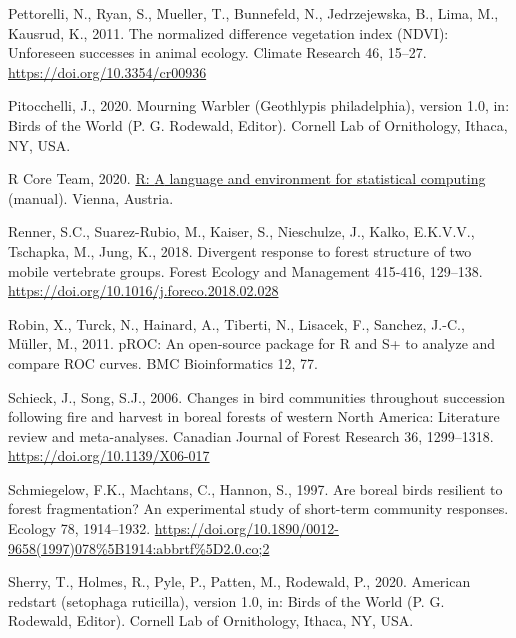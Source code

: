 \documentclass[
]{article}
\newlength{\cslhangindent}
\newlength{\cslentryspacingunit} %
\newenvironment{CSLReferences}[2] %
 {%
  \setlength{\parindent}{0pt}
  \ifodd #1
  \let\oldpar\par
  \def\par{\hangindent=\cslhangindent\oldpar}
  \fi
  \setlength{\parskip}{#2\cslentryspacingunit}
 }%
 {}
\begin{document}
\begin{CSLReferences}{1}{0}
\leavevmode{}%
Pettorelli, N., Ryan, S., Mueller, T., Bunnefeld, N., Jedrzejewska, B., Lima, M., Kausrud, K., 2011. The normalized difference vegetation index ({NDVI}): Unforeseen successes in animal ecology. Climate Research 46, 15--27. \url{https://doi.org/10.3354/cr00936}

\leavevmode{}%
Pitocchelli, J., 2020. Mourning {Warbler} ({Geothlypis} philadelphia), version 1.0, in: Birds of the {World} ({P}. {G}. {Rodewald}, {Editor}). Cornell Lab of Ornithology, Ithaca, NY, USA.

\leavevmode{}%
R Core Team, 2020. \href{https://www.R-project.org/}{R: {A} language and environment for statistical computing} (manual). Vienna, Austria.

\leavevmode{}%
Renner, S.C., Suarez-Rubio, M., Kaiser, S., Nieschulze, J., Kalko, E.K.V.V., Tschapka, M., Jung, K., 2018. Divergent response to forest structure of two mobile vertebrate groups. Forest Ecology and Management 415-416, 129--138. \url{https://doi.org/10.1016/j.foreco.2018.02.028}

\leavevmode{}%
Robin, X., Turck, N., Hainard, A., Tiberti, N., Lisacek, F., Sanchez, J.-C., Müller, M., 2011. {pROC}: An open-source package for {R} and {S}+ to analyze and compare {ROC} curves. BMC Bioinformatics 12, 77.

\leavevmode{}%
Schieck, J., Song, S.J., 2006. Changes in bird communities throughout succession following fire and harvest in boreal forests of western {North} {America}: {Literature} review and meta-analyses. Canadian Journal of Forest Research 36, 1299--1318. \url{https://doi.org/10.1139/X06-017}

\leavevmode{}%
Schmiegelow, F.K., Machtans, C., Hannon, S., 1997. Are boreal birds resilient to forest fragmentation? {An} experimental study of short-term community responses. Ecology 78, 1914--1932. \url{https://doi.org/10.1890/0012-9658(1997)078\%5B1914:abbrtf\%5D2.0.co;2}

\leavevmode{}%
Sherry, T., Holmes, R., Pyle, P., Patten, M., Rodewald, P., 2020. American redstart (setophaga ruticilla), version 1.0, in: Birds of the {World} ({P}. {G}. {Rodewald}, {Editor}). Cornell Lab of Ornithology, Ithaca, NY, USA.


\end{CSLReferences}
\end{document}
